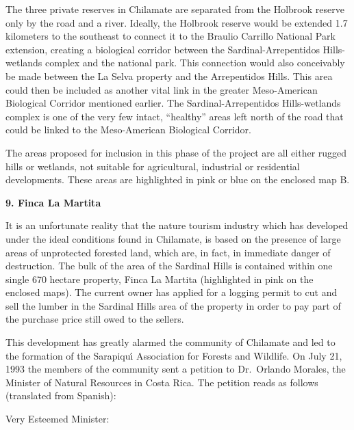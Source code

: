 The three private reserves in Chilamate are separated from the
Holbrook reserve only by the road and a river.  Ideally, the
Holbrook reserve would be extended 1.7 kilometers to the southeast
to connect it to the Braulio Carrillo National Park extension,
creating a biological corridor between the Sardinal-Arrepentidos
Hills-wetlands complex and the national park.  This connection would
also conceivably be made between the La Selva property and the
Arrepentidos Hills.  This area could then be included as another
vital link in the greater Meso-American Biological Corridor
mentioned earlier.  The Sardinal-Arrepentidos Hills-wetlands complex
is one of the very few intact, ``healthy'' areas left north of the
road that could be linked to the Meso-American Biological Corridor.

The areas proposed for inclusion in this phase of the project are all
either rugged hills or wetlands, not suitable for agricultural, industrial
or residential developments.  These areas are highlighted in pink
or blue on the enclosed map B.

\LP
{\large {\bf 9. Finca La Martita}}
\eLP

It is an unfortunate reality that the nature tourism industry which
has developed under the ideal conditions found in Chilamate, is
based on the presence of large areas of unprotected forested land,
which are, in fact, in immediate danger of destruction.  The bulk of
the area of the Sardinal Hills is contained within one single 670
hectare property, Finca La Martita (highlighted in pink on the
enclosed maps).  The current owner has applied for a logging permit
to cut and sell the lumber in the Sardinal Hills area of the
property in order to pay part of the purchase price still owed to
the sellers.

This development has greatly alarmed the community of Chilamate and
led to the formation of the Sarapiqu\'{\i} Association for Forests
and Wildlife.  On July 21, 1993 the members of the community sent a
petition to Dr.\ Orlando Morales, the Minister of Natural Resources
in Costa Rica.  The petition reads as follows (translated from
Spanish):

\LP
Very Esteemed Minister:
\eLP

